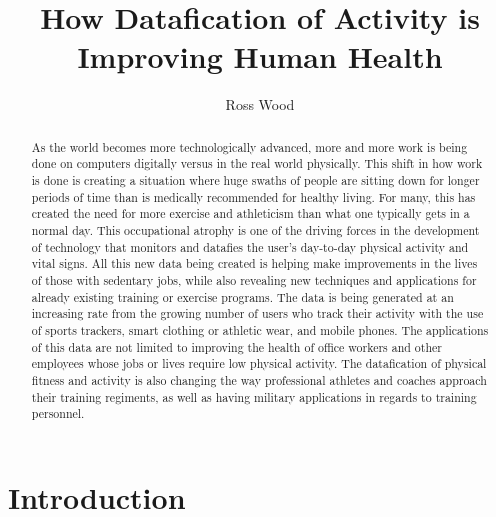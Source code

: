 \documentclass[sigconf]{acmart}
\begin{document}
\title{How Datafication of Activity is Improving Human Health}


\author{Ross Wood}

\renewcommand{\shortauthors}{G. v. Laszewski}


\begin{abstract}
As the world becomes more technologically advanced, more and more work is being done on computers digitally versus in the real world physically. This shift in how work is done is creating a situation where huge swaths of people are sitting down for longer periods of time than is medically recommended for healthy living. For many, this has created the need for more exercise and athleticism than what one typically gets in a normal day. This occupational atrophy is one of the driving forces in the development of technology that monitors and datafies the user's day-to-day physical activity and vital signs. All this new data being created is helping make improvements in the lives of those with sedentary jobs, while also revealing new techniques and applications for already existing training or exercise programs. The data is being generated at an increasing rate from the growing number of users who track their activity with the use of sports trackers, smart clothing or athletic wear, and mobile phones. The applications of this data are not limited to improving the health of office workers and other employees whose jobs or lives require low physical activity. The datafication of physical fitness and activity is also changing the way professional athletes and coaches approach their training regiments, as well as having military applications in regards to training personnel.
\end{abstract}



\maketitle



\section{Introduction}
\end{document}
